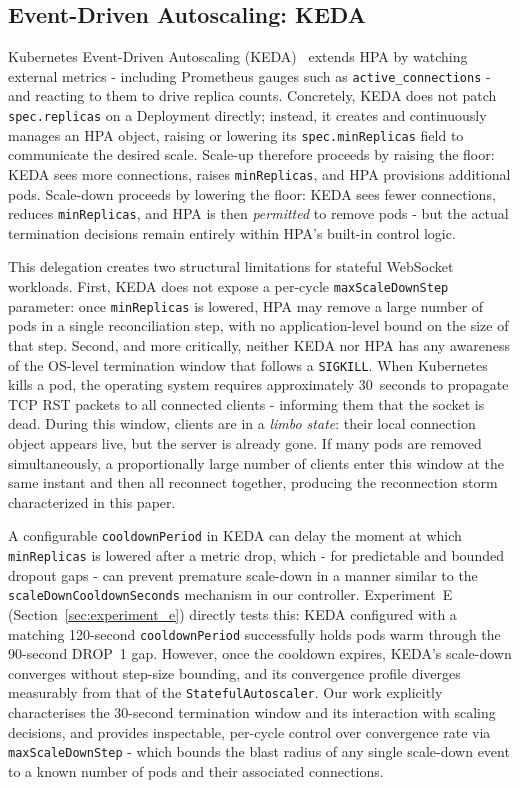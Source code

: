 \documentclass[twocolumn]{svjour3}
\begin{document}
\subsection{Event-Driven Autoscaling: KEDA}

Kubernetes Event-Driven Autoscaling (KEDA)~\cite{keda_docs} extends HPA by watching external metrics - including Prometheus gauges such as \texttt{active\_connections} - and reacting to them to drive replica counts. Concretely, KEDA does not patch \texttt{spec.replicas} on a Deployment directly; instead, it creates and continuously manages an HPA object, raising or lowering its \texttt{spec.minReplicas} field to communicate the desired scale. Scale-up therefore proceeds by raising the floor: KEDA sees more connections, raises \texttt{minReplicas}, and HPA provisions additional pods. Scale-down proceeds by lowering the floor: KEDA sees fewer connections, reduces \texttt{minReplicas}, and HPA is then \textit{permitted} to remove pods - but the actual termination decisions remain entirely within HPA's built-in control logic.

This delegation creates two structural limitations for stateful WebSocket workloads. First, KEDA does not expose a per-cycle \texttt{maxScaleDownStep} parameter: once \texttt{minReplicas} is lowered, HPA may remove a large number of pods in a single reconciliation step, with no application-level bound on the size of that step. Second, and more critically, neither KEDA nor HPA has any awareness of the OS-level termination window that follows a \texttt{SIGKILL}. When Kubernetes kills a pod, the operating system requires approximately 30~seconds to propagate TCP RST packets to all connected clients - informing them that the socket is dead. During this window, clients are in a \textit{limbo state}: their local connection object appears live, but the server is already gone. If many pods are removed simultaneously, a proportionally large number of clients enter this window at the same instant and then all reconnect together, producing the reconnection storm characterized in this paper.

A configurable \texttt{cooldownPeriod} in KEDA can delay the moment at which \texttt{minReplicas} is lowered after a metric drop, which - for predictable and bounded dropout gaps - can prevent premature scale-down in a manner similar to the \texttt{scaleDownCooldownSeconds} mechanism in our controller. Experiment~E (Section~\ref{sec:experiment_e}) directly tests this: KEDA configured with a matching 120-second \texttt{cooldownPeriod} successfully holds pods warm through the 90-second DROP~1 gap. However, once the cooldown expires, KEDA's scale-down converges without step-size bounding, and its convergence profile diverges measurably from that of the \texttt{StatefulAutoscaler}. Our work explicitly characterises the 30-second termination window and its interaction with scaling decisions, and provides inspectable, per-cycle control over convergence rate via \texttt{maxScaleDownStep} - which bounds the blast radius of any single scale-down event to a known number of pods and their associated connections.
\end{document}

